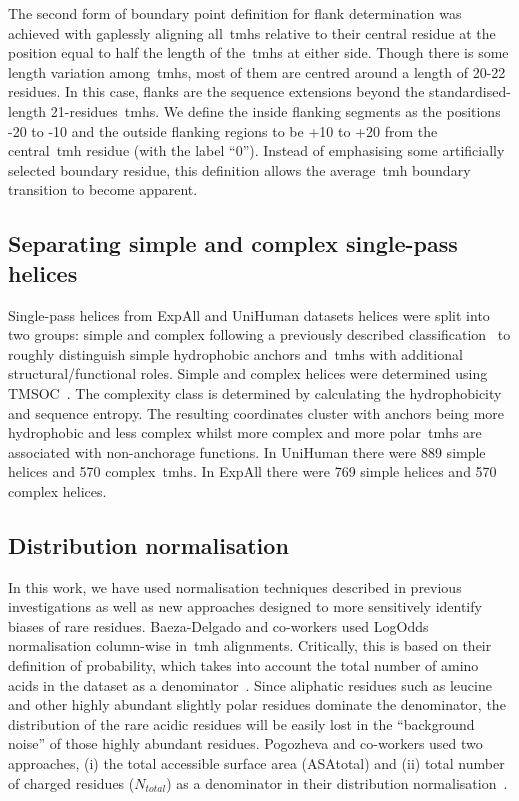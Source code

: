 The second form of boundary point definition for flank determination was achieved with gaplessly aligning all~\gls{tmh}s relative to their central residue at the position equal to half the length of the~\gls{tmh}s at either side.
Though there is some length variation among~\gls{tmh}s, most of them are centred around a length of 20-22 residues.
In this case, flanks are the sequence extensions beyond the standardised-length 21-residues~\gls{tmh}s.
We define the inside flanking segments as the positions -20 to -10 and the outside flanking regions to be +10 to +20 from the central~\gls{tmh} residue (with the label ``0'').
Instead of emphasising some artificially selected boundary residue, this definition allows the average~\gls{tmh} boundary transition to become apparent.

\subsection{Separating simple and complex single\--pass helices}

Single\--pass helices from ExpAll and UniHuman datasets helices were split into two groups: simple and complex following a previously described classification~\cite{Wong2011,Wong2012} to roughly distinguish simple hydrophobic anchors and~\gls{tmh}s with additional structural/functional roles.
Simple and complex helices were determined using TMSOC~\cite{Wong2012}.
The complexity class is determined by calculating the hydrophobicity and sequence entropy.
The resulting coordinates cluster with anchors being more hydrophobic and less complex whilst more complex and more polar~\gls{tmh}s are associated with non-anchorage functions.
In UniHuman there were 889 simple helices and 570 complex~\gls{tmh}s.
In ExpAll there were 769 simple helices and 570 complex helices.

\subsection{Distribution normalisation}

In this work, we have used normalisation techniques described in previous investigations as well as new approaches designed to more sensitively identify biases of rare residues.
Baeza-Delgado and co-workers used LogOdds normalisation column-wise in~\gls{tmh} alignments.
Critically, this is based on their definition of probability, which takes into account the total number of amino acids in the dataset as a denominator~\cite{Baeza-Delgado2013}.
Since aliphatic residues such as leucine and other highly abundant slightly polar residues dominate the denominator, the distribution of the rare acidic residues will be easily lost in the ``background noise'' of those highly abundant residues.
Pogozheva and co-workers used two approaches, (i) the total accessible surface area (ASAtotal) and (ii) total number of charged residues (${N}_{total}$) as a denominator in their distribution normalisation~\cite{Pogozheva2013}.

